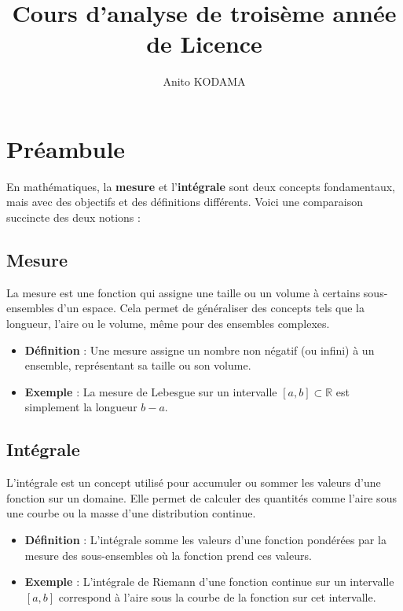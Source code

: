 
\usepackage{tikz}
\usepackage[scr=rsfs]{mathalpha}
\author{Anito KODAMA}

\title{\textbf{Cours d'analyse de troisème année de Licence}}

\maketitle
\tableofcontents
\newpage
\section*{Préambule}

En mathématiques, la \textbf{mesure} et l'\textbf{intégrale} sont deux concepts fondamentaux, mais avec des objectifs et des définitions différents. Voici une comparaison succincte des deux notions :

\subsection*{Mesure}
La mesure est une fonction qui assigne une taille ou un volume à certains sous-ensembles d'un espace. Cela permet de généraliser des concepts tels que la longueur, l'aire ou le volume, même pour des ensembles complexes.

\begin{itemize}
    \item \textbf{Définition} : Une mesure assigne un nombre non négatif (ou infini) à un ensemble, représentant sa taille ou son volume.
    \item \textbf{Exemple} : La mesure de Lebesgue sur un intervalle \([a, b] \subset \mathbb{R}\) est simplement la longueur \(b - a\).
\end{itemize}

\subsection*{Intégrale}
L'intégrale est un concept utilisé pour accumuler ou sommer les valeurs d'une fonction sur un domaine. Elle permet de calculer des quantités comme l'aire sous une courbe ou la masse d'une distribution continue.

\begin{itemize}
    \item \textbf{Définition} : L'intégrale somme les valeurs d'une fonction pondérées par la mesure des sous-ensembles où la fonction prend ces valeurs.
    \item \textbf{Exemple} : L'intégrale de Riemann d'une fonction continue sur un intervalle \([a, b]\) correspond à l'aire sous la courbe de la fonction sur cet intervalle.
\end{itemize}


